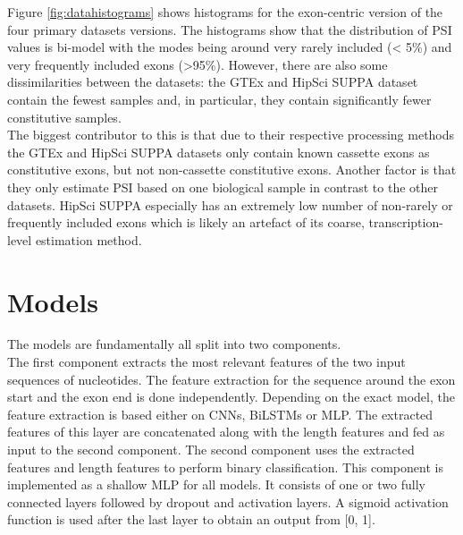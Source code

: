 Figure \ref{fig:datahistograms} shows histograms for the exon-centric version of the four primary datasets versions. The histograms show that the distribution of PSI values is bi-model with the modes being around very rarely included (< 5\%) and very frequently included exons (>95\%). However, there are also some dissimilarities between the datasets: the GTEx and HipSci SUPPA dataset contain the fewest samples and, in particular, they contain significantly fewer constitutive samples.\\
The biggest contributor to this is that due to their respective processing methods the GTEx and HipSci SUPPA datasets only contain known cassette exons as constitutive exons, but not non-cassette constitutive exons. Another factor is that they only estimate PSI based on one biological sample in contrast to the other datasets. HipSci SUPPA especially has an extremely low number of non-rarely or frequently included exons which is likely an artefact of its coarse, transcription-level estimation method.\\
\section{Models} \label{sec:models}
The models are fundamentally all split into two components. \\
The first component extracts the most relevant features of the two input sequences of nucleotides. The feature extraction for the sequence around the exon start and the exon end is done independently. Depending on the exact model, the feature extraction is based either on CNNs, BiLSTMs or MLP. The extracted features of this layer are concatenated along with the length features and fed as input to the second component.
The second component uses the extracted features and length features to perform binary classification. This component is implemented as a shallow MLP for all models. It consists of one or two fully connected layers followed by dropout and activation layers. A sigmoid activation function is used after the last layer to obtain an output from [0, 1].
